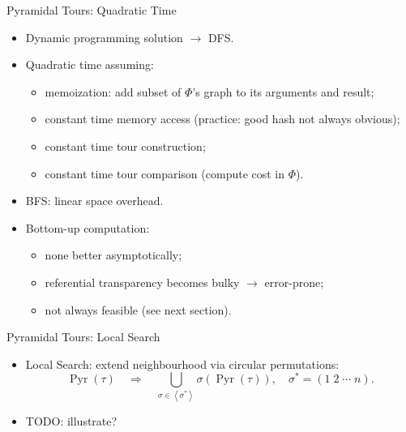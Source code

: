 \documentclass[
  size=10pt,
  style=klope,
  paper=screen,
  pauseslide,
  nopagebreaks,
  hlsections,
  fleqn
]{powerdot}
\def\todo{\color{red}}
\def\eqitspace{\vspace{-5mm}}
\begin{document}
\begin{slide}[toc=Dynamic Programming${,}$ Recursion and Time Complexity]{Pyramidal Tours: Quadratic Time}
  \begin{itemize}
  \item
  Dynamic programming solution $\rightarrow$ DFS.
  \item
  Quadratic time assuming:
  \begin{itemize}
    \item memoization: add subset of $\Phi$'s graph to its arguments and result;
    \item constant time memory access (practice: good hash not always obvious);
    \item constant time tour construction;
    \item constant time tour comparison (compute cost in $\Phi$).
  \end{itemize}
  \item
  BFS: linear space overhead.
  \item
  Bottom-up computation:
  \begin{itemize}
    \item
    none better asymptotically;
    \item
    referential transparency becomes bulky $\rightarrow$ error-prone;
    \item
    not always feasible (see next section).
  \end{itemize}
  \end{itemize}
\end{slide}

\begin{slide}[toc=]{Pyramidal Tours: Local Search}
  \begin{itemize}
  \item
    Local Search: extend neighbourhood via circular permutations:
    \begin{equation}
      \operatorname{Pyr}\left(\tau\right)
      \quad \Rightarrow \quad
      \bigcup_{\sigma \in \left<\sigma^\ast\right>}\sigma\left(\operatorname{Pyr}\left(\tau\right)\right),
      \quad \sigma^\ast = \left(1\;2\;\cdots\;n\right).
    \end{equation}
  \eqitspace
  \item
  {\todo TODO:} illustrate?
  \end{itemize}
\end{slide}
\end{document}
